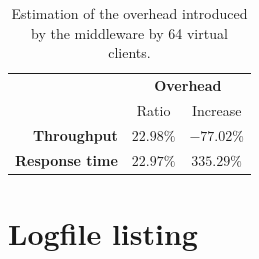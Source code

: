 \documentclass[11pt]{article}
\theoremstyle{definition}
\renewcommand\b[1]{{\bf{#1}}}
\begin{document}
\begin{table}[h]
    \centering
    \small
    {
        \smallskip
        \begin{tabular}{|r||c|c|}
            \hline
             & \multicolumn{2}{c|}{\b{Overhead}} \\\cline{2-3}
             & Ratio & Increase \\
            \hline
            \hline
            \b{Throughput} & $22.98\%$ & $-77.02\%$ \\
            \hline
            \b{Response time} & $22.97\%$ & $335.29\%$ \\ 
            \hline
        \end{tabular}

    }
    \caption{Estimation of the overhead introduced by the middleware by 64 virtual clients.}
    \label{tab:overhead}
\end{table}

\section*{Logfile listing}
\end{document}
